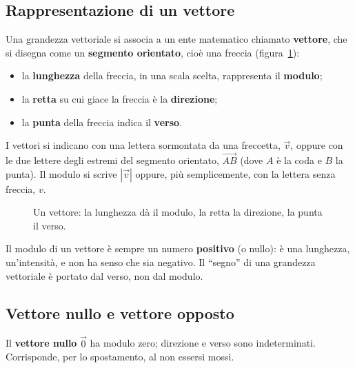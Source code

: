 \subsection{Rappresentazione di un vettore}
Una grandezza vettoriale si associa a un ente matematico chiamato \textbf{vettore}, che si disegna come un \textbf{segmento orientato}, cioè una freccia (figura~\ref{fig:vettore}):
\begin{itemize}
\item la \textbf{lunghezza} della freccia, in una scala scelta, rappresenta il \textbf{modulo};
\item la \textbf{retta} su cui giace la freccia è la \textbf{direzione};
\item la \textbf{punta} della freccia indica il \textbf{verso}.
\end{itemize}
I vettori si indicano con una lettera sormontata da una freccetta, $\vec{v}$, oppure con le due lettere degli estremi del segmento orientato, $\vec{AB}$ (dove $A$ è la coda e $B$ la punta). Il modulo si scrive $|\vec{v}|$ oppure, più semplicemente, con la lettera senza freccia, $v$.

\begin{figure}[h!]
\centering
{}
\caption{Un vettore: la lunghezza dà il modulo, la retta la direzione, la punta il verso.}
\label{fig:vettore}
\end{figure}

\begin{remark}
Il modulo di un vettore è sempre un numero \textbf{positivo} (o nullo): è una lunghezza, un'intensità, e non ha senso che sia negativo. Il ``segno'' di una grandezza vettoriale è portato dal verso, non dal modulo.
\end{remark}

\subsection{Vettore nullo e vettore opposto}
Il \textbf{vettore nullo} $\vec{0}$ ha modulo zero; direzione e verso sono indeterminati. Corrisponde, per lo spostamento, al non essersi mossi.

